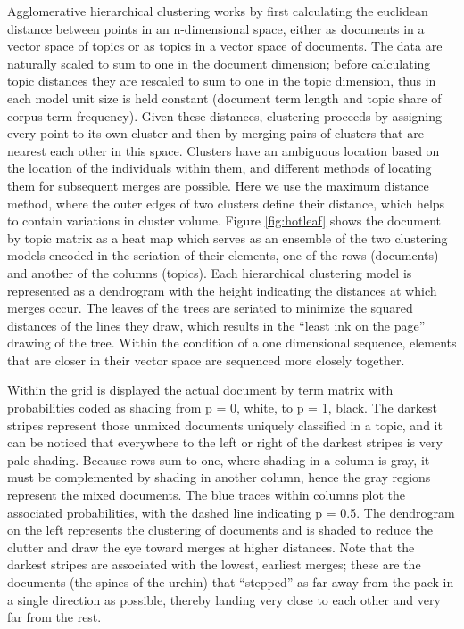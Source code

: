 \documentclass[]{book}
\theoremstyle{definition}
\theoremstyle{definition}
\theoremstyle{definition}
\theoremstyle{remark}
\begin{document}
Agglomerative hierarchical clustering works by first calculating the
euclidean distance between points in an n-dimensional space, either as
documents in a vector space of topics or as topics in a vector space of
documents. The data are naturally scaled to sum to one in the document
dimension; before calculating topic distances they are rescaled to sum
to one in the topic dimension, thus in each model unit size is held
constant (document term length and topic share of corpus term
frequency). Given these distances, clustering proceeds by assigning
every point to its own cluster and then by merging pairs of clusters
that are nearest each other in this space. Clusters have an ambiguous
location based on the location of the individuals within them, and
different methods of locating them for subsequent merges are possible.
Here we use the maximum distance method, where the outer edges of two
clusters define their distance, which helps to contain variations in
cluster volume. Figure \ref{fig:hotleaf} shows the document by topic
matrix as a heat map which serves as an ensemble of the two clustering
models encoded in the seriation of their elements, one of the rows
(documents) and another of the columns (topics). Each hierarchical
clustering model is represented as a dendrogram with the height
indicating the distances at which merges occur. The leaves of the trees
are seriated to minimize the squared distances of the lines they draw,
which results in the ``least ink on the page'' drawing of the tree.
Within the condition of a one dimensional sequence, elements that are
closer in their vector space are sequenced more closely together.

Within the grid is displayed the actual document by term matrix with
probabilities coded as shading from p = 0, white, to p = 1, black. The
darkest stripes represent those unmixed documents uniquely classified in
a topic, and it can be noticed that everywhere to the left or right of
the darkest stripes is very pale shading. Because rows sum to one, where
shading in a column is gray, it must be complemented by shading in
another column, hence the gray regions represent the mixed documents.
The blue traces within columns plot the associated probabilities, with
the dashed line indicating p = 0.5. The dendrogram on the left
represents the clustering of documents and is shaded to reduce the
clutter and draw the eye toward merges at higher distances. Note that
the darkest stripes are associated with the lowest, earliest merges;
these are the documents (the spines of the urchin) that ``stepped'' as
far away from the pack in a single direction as possible, thereby
landing very close to each other and very far from the rest.
\end{document}
